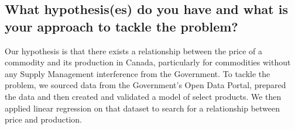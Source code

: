 \subsection{What hypothesis(es) do you have and what is your approach to tackle the problem?}

Our hypothesis is that there exists a relationship between the price of a commodity and its production in Canada, particularly for commodities without any Supply Management interference from the Government.
To tackle the problem, we sourced data from the Government's Open Data Portal, prepared the data and then created and validated a model of select products.
We then applied linear regression on that dataset to search for a relationship between price and production.
